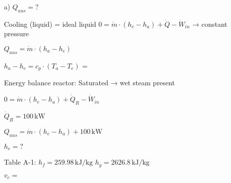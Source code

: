 a) \( Q_{aus} = ? \)  

Cooling (liquid) = ideal liquid  
\( 0 = \dot{m} \cdot (h_e - h_a) + \dot{Q} - \dot{W}_{in} \) → constant pressure  

\( Q_{aus} = \dot{m} \cdot (h_a - h_e) \)  

\( h_a - h_e = c_p \cdot (T_a - T_e) \)  
=  

Energy balance reactor:  
Saturated → wet steam present  

\( 0 = \dot{m} \cdot (h_e - h_a) + \dot{Q}_R - \dot{W}_{in} \)  

\( \dot{Q}_R = 100 \, \text{kW} \)  

\( Q_{aus} = \dot{m} \cdot (h_e - h_a) + 100 \, \text{kW} \)  

\( h_e = ? \)  

Table A-1:  
\( h_f = 259.98 \, \text{kJ/kg} \)  
\( h_g = 2626.8 \, \text{kJ/kg} \)  

\( v_e = \)